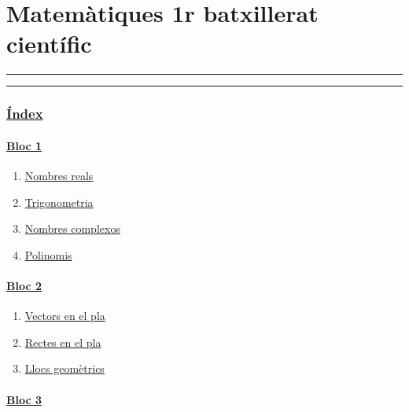\documentclass[]{article}
\date{}
\providecommand{\tightlist}{%
  \setlength{\itemsep}{0pt}\setlength{\parskip}{0pt}}
\let\oldparagraph\paragraph
\renewcommand{\paragraph}[1]{\oldparagraph{#1}\mbox{}}
\begin{document}
\section{Matemàtiques 1r batxillerat
científic}\label{matemuxe0tiques-1r-batxillerat-cientuxedfic}

\begin{center}\rule{0.5\linewidth}{\linethickness}\end{center}

\begin{center}\rule{0.5\linewidth}{\linethickness}\end{center}

\subsubsection{\texorpdfstring{\hyperref[index]{Índex}}{Índex}}\label{uxedndex}

\paragraph{\texorpdfstring{\hyperref[bloc1]{Bloc
1}}{Bloc 1}}\label{bloc-1}

\begin{enumerate}
\def\labelenumi{\arabic{enumi}.}
\tightlist
\item
  \hyperref[tema1]{Nombres reals}
\item
  \hyperref[tema2]{Trigonometria}
\item
  \hyperref[tema3]{Nombres complexos}
\item
  \hyperref[tema4]{Polinomis}
\end{enumerate}

\paragraph{\texorpdfstring{\hyperref[bloc2]{Bloc
2}}{Bloc 2}}\label{bloc-2}

\begin{enumerate}
\def\labelenumi{\arabic{enumi}.}
\setcounter{enumi}{4}
\tightlist
\item
  \hyperref[tema4]{Vectors en el pla}
\item
  \hyperref[tema5]{Rectes en el pla}
\item
  \hyperref[tema6]{Llocs geomètrics}
\end{enumerate}

\paragraph{\texorpdfstring{\hyperref[bloc3]{Bloc
3}}{Bloc 3}}\label{bloc-3}
\end{document}
